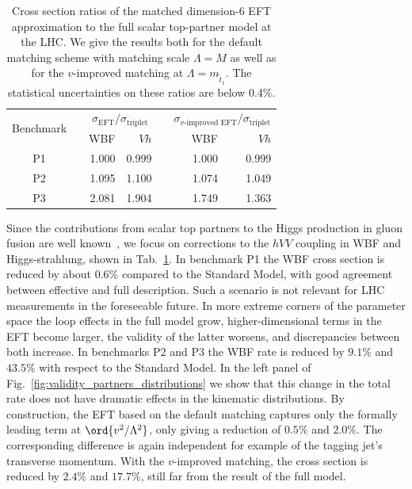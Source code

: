 \begin{table}[t] \renewcommand{\arraystretch}{1.2} \centering
    \begin{tabular}{c c rr c rr} \toprule \multirow{2}{*}{Benchmark}
&\hspace*{1em}& \multicolumn{2}{c}{$\sigma_\text{EFT} /
\sigma_\text{triplet}$} &\hspace*{1em}&
\multicolumn{2}{c}{$\sigma_\text{$v$-improved EFT} /
\sigma_\text{triplet}$} \\ \cmidrule{3-4}\cmidrule{6-7} && WBF & $Vh$
&& WBF & $Vh$ \\ \midrule P1 && 1.000 & 0.999 && 1.000 & 0.999 \\ P2
&& 1.095 & 1.100 && 1.074 & 1.049 \\ P3 && 2.081 & 1.904 && 1.749 &
1.363 \\ \bottomrule
    \end{tabular}
  \caption{Cross section ratios of the matched dimension-6 EFT
approximation to the full scalar top-partner model at the LHC.  We
give the results both for the default matching scheme with matching
scale $\Lambda = M$ as well as for the $v$-improved matching at
$\Lambda = m_{\tilde{t}_{1}}$. The statistical uncertainties on these
ratios are below 0.4\%.}
  \label{tab:partners_rates}
\end{table}

Since the contributions from scalar top partners to the Higgs
production in gluon fusion are well known~\cite{hgg-toppartners}, we
focus on corrections to the $hVV$ coupling in WBF and Higgs-strahlung,
shown in Tab.~\ref{tab:partners_rates}.  In benchmark P1 the WBF cross
section is reduced by about $0.6 \%$ compared to the Standard Model,
with good agreement between effective and full description. Such a
scenario is not relevant for LHC measurements in the foreseeable
future. In more extreme corners of the parameter space the loop
effects in the full model grow, higher-dimensional terms in the EFT
become larger, the validity of the latter worsens, and discrepancies
between both increase.  In benchmarks P2 and P3 the WBF rate is
reduced by $9.1\%$ and $43.5\%$ with respect to the Standard Model.
In the left panel of Fig.~\ref{fig:validity_partners_distributions} we show
that this change in the total rate does not have dramatic effects in
the kinematic distributions.  By construction, the EFT based on the
default matching captures only the formally leading term at
$\ord{v^2/\Lambda^2}$, only giving a reduction of $0.5\%$ and
$2.0\%$. The corresponding difference is again independent for example
of the tagging jet's transverse momentum.  With the $v$-improved
matching, the cross section is reduced by $2.4 \%$ and $17.7 \%$,
still far from the result of the full model.

